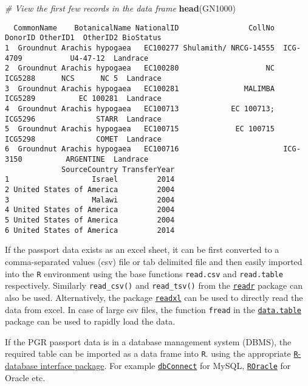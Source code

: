 \documentclass[
]{article}
\newenvironment{Shaded}{\begin{snugshade}}{\end{snugshade}}
\newcommand{\CommentTok}[1]{\textcolor[rgb]{0.56,0.35,0.01}{\textit{#1}}}
\newcommand{\KeywordTok}[1]{\textcolor[rgb]{0.13,0.29,0.53}{\textbf{#1}}}
\newcommand{\NormalTok}[1]{#1}
\begin{document}
\begin{Shaded}
\begin{Highlighting}[]
\CommentTok{# View the first few records in the data frame}
\KeywordTok{head}\NormalTok{(GN1000)}
\end{Highlighting}
\end{Shaded}

\begin{verbatim}
  CommonName    BotanicalName NationalID                CollNo   DonorID OtherID1  OtherID2 BioStatus
1  Groundnut Arachis hypogaea   EC100277 Shulamith/ NRCG-14555  ICG-4709           U4-47-12  Landrace
2  Groundnut Arachis hypogaea   EC100280                    NC   ICG5288      NCS      NC 5  Landrace
3  Groundnut Arachis hypogaea   EC100281               MALIMBA   ICG5289          EC 100281  Landrace
4  Groundnut Arachis hypogaea   EC100713            EC 100713;   ICG5296              STARR  Landrace
5  Groundnut Arachis hypogaea   EC100715             EC 100715   ICG5298              COMET  Landrace
6  Groundnut Arachis hypogaea   EC100716                        ICG-3150          ARGENTINE  Landrace
             SourceCountry TransferYear
1                   Israel         2014
2 United States of America         2004
3                   Malawi         2004
4 United States of America         2004
5 United States of America         2004
6 United States of America         2014
\end{verbatim}

If the passport data exists as an excel sheet, it can be first converted
to a comma-separated values (csv) file or tab delimited file and then
easily imported into the \texttt{R} environment using the base functions
\texttt{read.csv} and \texttt{read.table} respectively. Similarly
\texttt{read\_csv()} and \texttt{read\_tsv()} from the
\href{https://CRAN.R-project.org/package=readr}{\texttt{readr}} package
can also be used. Alternatively, the package
\href{https://CRAN.R-project.org/package=readxl}{\texttt{readxl}} can be
used to directly read the data from excel. In case of large csv files,
the function \texttt{fread} in the
\href{https://CRAN.R-project.org/package=data.table}{\texttt{data.table}}
package can be used to rapidly load the data.

If the PGR passport data is in a database management system (DBMS), the
required table can be imported as a data frame into \texttt{R}. using
the appropriate
\href{http://www.burns-stat.com/r-database-interfaces/}{\texttt{R}-database
interface package}. For example
\href{https://CRAN.R-project.org/package=dbConnect}{\texttt{dbConnect}}
for MySQL,
\href{https://CRAN.R-project.org/package=ROracle}{\texttt{ROracle}} for
Oracle etc.
\end{document}
